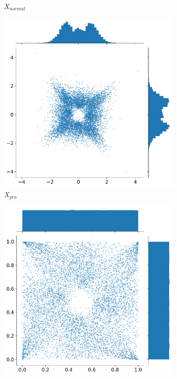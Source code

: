 \begin{figure}[htp]
\begin{subfigure}{0.3\textwidth}
\caption{$X_{normal}$}
\end{subfigure}
\begin{subfigure}{0.3\textwidth}
\centering
    \includegraphics[width=\textwidth]{../Plots/Transformations/ring_joint_marginal_pca.pdf} \quad
\caption{$X_{pca}$}
\end{subfigure}
\begin{subfigure}{0.3\textwidth}
\centering
    \includegraphics[width=\textwidth]{../Plots/Transformations/ring_joint_marginal_uniform.pdf}

\end{subfigure}
\end{figure}
